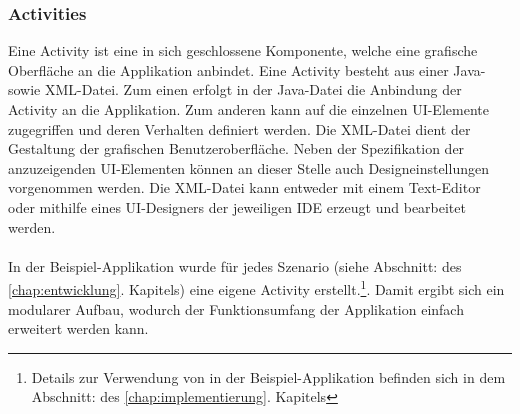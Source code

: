 \documentclass[Bachelorarbeit.tex]{subfiles}
\begin{document}
\subsubsection*{Activities}
\label{subsubsec:activities}
Eine Activity ist eine in sich geschlossene Komponente, welche eine grafische Oberfläche an die Applikation anbindet.
Eine Activity besteht aus einer Java- sowie \ac{XML}-Datei.
Zum einen erfolgt in der Java-Datei die Anbindung der Activity an die Applikation. 
Zum anderen kann auf die einzelnen \ac{UI}-Elemente zugegriffen und deren  Verhalten definiert werden.
Die \ac{XML}-Datei dient der Gestaltung der grafischen Benutzeroberfläche.
Neben der Spezifikation der anzuzeigenden \ac{UI}-Elementen können an dieser Stelle auch Designeinstellungen vorgenommen werden.
Die \ac{XML}-Datei kann entweder mit einem Text-Editor oder mithilfe eines \ac{UI}-Designers der jeweiligen \ac{IDE} erzeugt und bearbeitet werden.\\
\\
In der Beispiel-Applikation wurde für jedes Szenario (siehe Abschnitt:  des \ref{chap:entwicklung}. Kapitels) eine eigene Activity erstellt.\footnote{Details zur Verwendung von  in der Beispiel-Applikation befinden sich in dem Abschnitt:  des \ref{chap:implementierung}. Kapitels}. 
Damit ergibt sich ein modularer Aufbau, wodurch der Funktionsumfang der Applikation einfach erweitert werden kann.
\end{document}
